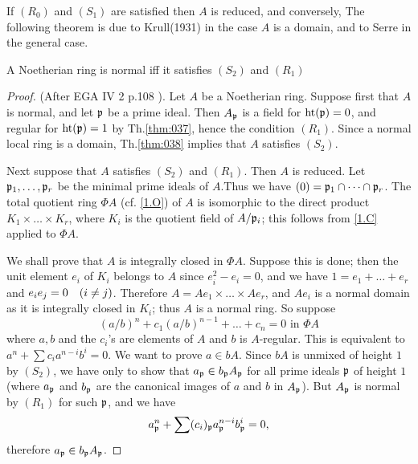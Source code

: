 \documentclass[../main]{subfiles}
\begin{document}
If $(R_0)$ and $(S_1)$ are satisfied then $A$ is reduced, and conversely, The following theorem is due to Krull(1931) in the case $A$ is a domain, and to Serre in the general case.
\begin{theorem}\label{thm:039}
A Noetherian ring is normal iff it satisfies $(S_2)$ and $(R_1)$
\end{theorem}
\begin{proof}
(After EGA IV 2 p.108 \cite{egaIV2}). Let $A$ be a Noetherian ring.
Suppose first that $A$ is normal, and let $\mathfrak{p}$ be a prime ideal. Then $A_{\mathfrak{p}}$ is a field for $\operatorname{ht}(\mathfrak{p})=0$, and regular for $\operatorname{ht}(\mathfrak{p})=1$ by Th.\ref{thm:037}, hence the condition $(R_1)$. Since a normal local ring is a domain, Th.\ref{thm:038} implies that $A$ satisfies $(S_2)$.

Next suppose that $A$ satisfies $(S_2)$ and $(R_1)$. Then $A$ is reduced. Let $\mathfrak{p}_1, \dots, \mathfrak{p}_r$ be the minimal prime ideals of $A$.Thus we have $(0)=\mathfrak{p}_1 \cap \dots \cap \mathfrak{p}_{r}$. The total quotient ring $\Phi A$ (cf. \ref{1.O}) of $A$ is isomorphic to the direct product $K_1 \times \ldots \times K_r$, where $K_i$ is the quotient field of $A / \mathfrak{p}_i$; this follows from \ref{1.C} applied to $\Phi A$.

We shall prove that $A$ is integrally closed in $\Phi A$. Suppose this is done; then the unit element $e_i$ of $K_i$ belongs to $A$ since $e_i^2-e_i=0$, and we have $1=e_1+\ldots+e_r$ and $e_i e_j=0\for{i \neq j}$. Therefore $A=Ae_1 \times \dots \times Ae_r$, and $A e_i$ is a normal domain as it is integrally closed in $K_i$; thus $A$ is a normal ring. So suppose
\[(a / b)^n+c_1(a / b)^{n-1}+\ldots+c_n=0 \text { in } \Phi A\]
where $a, b$ and the $c_i$'s are elements of $A$ and $b$ is $A$-regular. This is equivalent to $a^n+\sum c_i a^{n-i}b^i=0$. We want to prove $a\in bA$. Since $bA$ is unmixed of height $1$ by $(S_2)$, we have only to show that $a_{\mathfrak{p}} \in b_{\mathfrak{p}} A_{\mathfrak{p}}$ for all prime ideals $\mathfrak{p}$ of height $1$ (where $a_{\mathfrak{p}}$ and $b_{\mathfrak{p}}$ are the canonical images of $a$ and $b$ in $A_{\mathfrak{p}}$). But $A_{\mathfrak{p}}$ is normal by $(R_1)$ for such $\mathfrak{p}$, and we have \[a_{\mathfrak{p}}^n+\sum (c_i)_{\mathfrak{p}} a_{\mathfrak{p}}^{n-i} b_{\mathfrak{p}}^i=0,\] therefore $a_{\mathfrak{p}}\in b_{\mathfrak{p}} A_{\mathfrak{p}}$.
\end{proof}
\end{document}
